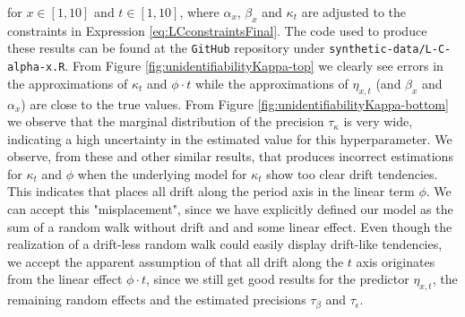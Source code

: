 for $x\in[1,10]$ and $t\in[1,10]$, where $\alpha_x$, $\beta_x$ and $\kappa_t$ are adjusted to the constraints in Expression \ref{eq:LCconstraintsFinal}. The code used to produce these results can be found at the \texttt{GitHub} repository under \texttt{synthetic-data/L-C-alpha-x.R}. From Figure \ref{fig:unidentifiabilityKappa-top} we clearly see errors in the approximations of $\kappa_t$ and $\phi\cdot t$ while the approximations of $\eta_{x,t}$ (and $\beta_x$ and $\alpha_x$) are close to the true values. From Figure \ref{fig:unidentifiabilityKappa-bottom} we observe that the marginal distribution of the precision $\tau_\kappa$ is very wide, indicating a high uncertainty in the estimated value for this hyperparameter. We observe, from these and other similar results, that \inlabru produces incorrect estimations for $\kappa_t$ and $\phi$ when the underlying model for $\kappa_t$ show too clear drift tendencies. This indicates that \inlabru places all drift along the period axis in the linear term $\phi$. We can accept this "misplacement", since we have explicitly defined our model as the sum of a random walk without drift and and some linear effect. Even though the realization of a drift-less random walk could easily display drift-like tendencies, we accept the apparent assumption of \inlabru that all drift along the $t$ axis originates from the linear effect $\phi \cdot t$, since we still get good results for the predictor $\eta_{x,t}$, the remaining random effects and the estimated precisions $\tau_\beta$ and $\tau_\epsilon$.
\newline
